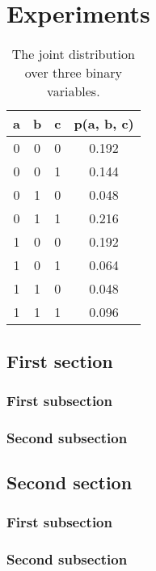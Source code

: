 \chapter{Experiments}\label{chapter:experiments}
\thispagestyle{chapterBeginStyle}

\begin{table}[h!]
\centering
\begin{tabular}{|c c c c|}  
 \hline
 a & b & c & p(a, b, c) \\ [1.0ex] 
 \hline
 0 & 0 & 0 & 0.192 \\
 \hline
 0 & 0 & 1 & 0.144 \\
 \hline
 0 & 1 & 0 & 0.048 \\
 \hline
 0 & 1 & 1 & 0.216 \\
 \hline
 1 & 0 & 0 & 0.192 \\
 \hline
 1 & 0 & 1 & 0.064 \\
 \hline
 1 & 1 & 0 & 0.048 \\
 \hline
 1 & 1 & 1 & 0.096 \\
 \hline
\end{tabular}
\caption{The joint distribution over three binary variables.}
\label{table:joint-distribution}
\end{table}

\section{First section}
\subsection{First subsection}
\subsection{Second subsection}

\section{Second section}
\subsection{First subsection}
\subsection{Second subsection}